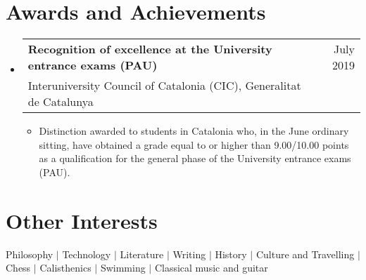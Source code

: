 \documentclass[a4paper,10pt]{article}
\makeatletter
\newcommand{\resumeTrioHeading}[3]{
  \item
    \begin{tabular*}{0.96\textwidth}[t]{
      l@{\extracolsep{\fill}}c@{\extracolsep{\fill}}r
    }
      \textbf{#1} & \small \textit{#2} & \small #3
    \end{tabular*}
}
\newcommand{\resumeQuadHeading}[4]{
  \item
  \begin{tabular*}{0.96\textwidth}[t]{l@{\extracolsep{\fill}}r}
    \textbf{#1} & \small #2 \\
    \small#3 & \small #4 \\
  \end{tabular*}
}
\newcommand{\resumeHeadingListStart}{
  \begin{itemize}[leftmargin=0.15in, label={}]
}
\newcommand{\resumeHeadingListEnd}{\end{itemize}}
\makeatother
\begin{document}
  

\section{Awards and Achievements}
  \resumeHeadingListStart{}
    \resumeQuadHeading{Recognition of excellence at the University entrance exams (PAU)}{July 2019}{Interuniversity Council of Catalonia (CIC), Generalitat de Catalunya}{\ }
    \begin{itemize}[leftmargin=3em, itemsep=0.1em, topsep=2pt]
      \item \small Distinction awarded to students in Catalonia who, in the June ordinary sitting, have obtained a grade equal to or higher than 9.00/10.00 points as a qualification for the general phase of the University entrance exams (PAU).
    \end{itemize}
  \resumeHeadingListEnd{}

\section{Other Interests}
  Philosophy \; $|$ \; Technology \; $|$ \; Literature \; $|$ \; Writing \; $|$ \; History \; $|$ \; Culture and Travelling \; $|$ \; Chess \; $|$ \; Calisthenics \; $|$ \; Swimming \; $|$ \; Classical music and guitar
\end{document}
